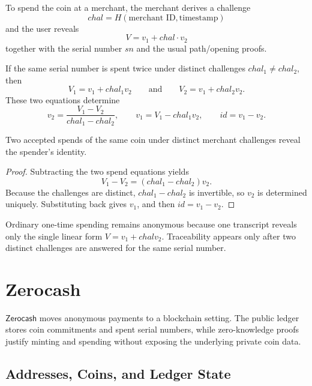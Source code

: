 \documentclass[11pt]{article}
\newcommand{\Zerocash}{\ensuremath{\mathsf{Zerocash}}}
\begin{document}
To spend the coin at a merchant, the merchant derives a challenge
\[
  \mathit{chal} = H(\text{merchant ID}, \text{timestamp})
\]
and the user reveals
\[
  V = v_1 + \mathit{chal} \cdot v_2
\]
together with the serial number $sn$ and the usual path/opening proofs.

\begin{graybox}[title={Double-Spend Tracing Rule}]
If the same serial number is spent twice under distinct challenges
$\mathit{chal}_1 \neq \mathit{chal}_2$, then
\[
  V_1 = v_1 + \mathit{chal}_1 v_2
  \qquad\text{and}\qquad
  V_2 = v_1 + \mathit{chal}_2 v_2.
\]
These two equations determine
\[
  v_2 = \frac{V_1 - V_2}{\mathit{chal}_1 - \mathit{chal}_2},
  \qquad
  v_1 = V_1 - \mathit{chal}_1 v_2,
  \qquad
  id = v_1 - v_2.
\]
\end{graybox}

\begin{proposition}
Two accepted spends of the same coin under distinct merchant challenges reveal
the spender's identity.
\end{proposition}

\begin{proof}
Subtracting the two spend equations yields
\[
  V_1 - V_2 = (\mathit{chal}_1 - \mathit{chal}_2) v_2.
\]
Because the challenges are distinct, $\mathit{chal}_1 - \mathit{chal}_2$ is
invertible, so $v_2$ is determined uniquely.  Substituting back gives $v_1$,
and then $id = v_1 - v_2$.
\end{proof}

\begin{remark}
Ordinary one-time spending remains anonymous because one transcript reveals
only the single linear form $V = v_1 + \mathit{chal} v_2$.  Traceability
appears only after two distinct challenges are answered for the same serial
number.
\end{remark}

\section{Zerocash}

\Zerocash{} moves anonymous payments to a blockchain setting.  The public
ledger stores coin commitments and spent serial numbers, while zero-knowledge
proofs justify minting and spending without exposing the underlying private
coin data.

\subsection{Addresses, Coins, and Ledger State}
\end{document}
